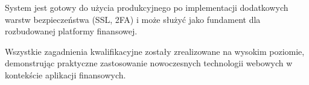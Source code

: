 \documentclass[12pt,a4paper]{article}
\begin{document}
    System jest gotowy do użycia produkcyjnego po implementacji dodatkowych warstw bezpieczeństwa (SSL, 2FA) i może służyć jako fundament dla rozbudowanej platformy finansowej.

    Wszystkie zagadnienia kwalifikacyjne zostały zrealizowane na wysokim poziomie, demonstrując praktyczne zastosowanie nowoczesnych technologii webowych w kontekście aplikacji finansowych.
\end{document}
